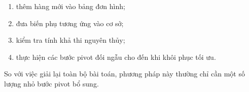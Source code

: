 \documentclass[fontsize=13pt,a4paper]{report}
\begin{document}
\begin{enumerate}

    \item thêm hàng mới vào bảng đơn hình;

    \item đưa biến phụ tương ứng vào cơ sở;

    \item kiểm tra tính khả thi nguyên thủy;

    \item thực hiện các bước pivot đối ngẫu cho đến khi khôi phục tối ưu.

\end{enumerate}

So với việc giải lại toàn bộ bài toán, phương pháp này thường chỉ cần một số lượng nhỏ bước pivot bổ sung.














\end{document}
